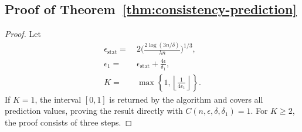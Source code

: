 \documentclass[11pt]{article}
\theoremstyle{statplain}
\theoremstyle{statdefinition}
\newcommand{\stat}{\mathrm{stat}}
\newcommand{\0}{\mathbf{0}}
\begin{document}
\subsection{Proof of Theorem~\ref{thm:consistency-prediction}}\label{proof:thm:consistency-prediction}

\begin{proof}
Let 
\begin{align*}
    \epsilon_\stat = &~ 2\Big(\frac{2\log(3n/\delta)}{\lambda n}\Big)^{1/3}, \\
    \epsilon_1 = &~ \epsilon_\stat + \frac{4\epsilon}{\delta_1},\\
    K = &~ \max\left\{1, \left\lfloor\frac{1}{4\epsilon_1}\right\rfloor\right\}. 
\end{align*} 
If $K=1$, the interval $[0,1]$ is returned by the algorithm and covers all prediction values, proving the result directly with $C(n,\epsilon,\delta,\delta_1)=1$. For $K \geq 2$, the proof consists of three steps. 


\end{proof}
\end{document}
